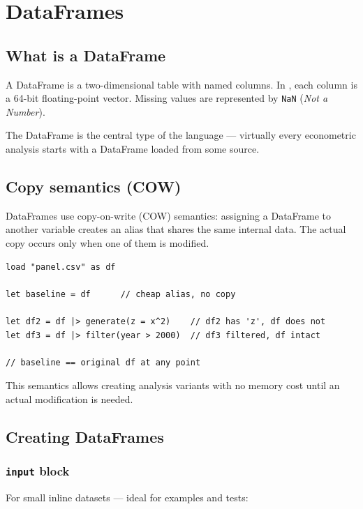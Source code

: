 \chapter{DataFrames}
\label{cap:dataframes}

\section{What is a DataFrame}

A DataFrame is a two-dimensional table with named columns. In \hayashi{},
each column is a 64-bit floating-point vector. Missing values are
represented by \texttt{NaN} (\textit{Not a Number}).

The DataFrame is the central type of the language — virtually every
econometric analysis starts with a DataFrame loaded from some source.

\section{Copy semantics (COW)}

DataFrames use copy-on-write (COW) semantics: assigning a DataFrame to
another variable creates an alias that shares the same internal data. The
actual copy occurs only when one of them is modified.

\begin{lstlisting}[caption={COW: baseline preserved}]
load "panel.csv" as df

let baseline = df      // cheap alias, no copy

let df2 = df |> generate(z = x^2)    // df2 has 'z', df does not
let df3 = df |> filter(year > 2000)  // df3 filtered, df intact

// baseline == original df at any point
\end{lstlisting}

This semantics allows creating analysis variants with no memory cost until
an actual modification is needed.

\section{Creating DataFrames}

\subsection*{\texttt{input} block}

For small inline datasets — ideal for examples and tests:

